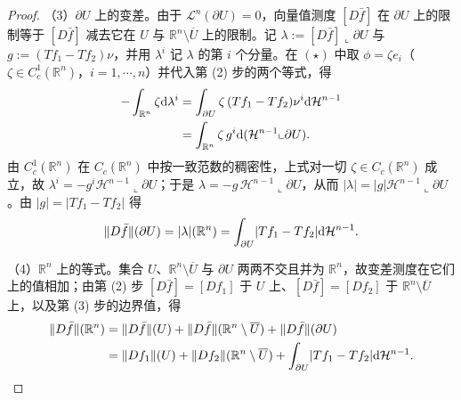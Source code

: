 \documentclass[../../main.tex]{subfiles}%
\begin{document}
\begin{proof}
（3）$\partial U$ 上的变差。由于 $\mathcal{L}^n(\partial U)=0$，向量值测度 $[D\bar f]$ 在 $\partial U$ 上的限制等于 $[D\bar f]$ 减去它在 $U$ 与 $\mathbb{R}^n\setminus\overline{U}$ 上的限制。记 $\lambda:=[D\bar f]\llcorner\partial U$ 与 $g:=(Tf_1-Tf_2)\nu$，并用 $\lambda^i$ 记 $\lambda$ 的第 $i$ 个分量。在 $(\star)$ 中取 $\phi=\zeta e_i$（$\zeta\in C_c^1(\mathbb{R}^n)$，$i=1,\cdots,n$）并代入第 (2) 步的两个等式，得
\begin{align*}
-\int_{\mathbb{R}^n}\zeta\mathrm{d}\lambda^i
&=\int_{\partial U}\zeta\,(Tf_1-Tf_2)\nu^i\mathrm{d}\mathcal{H}^{n-1}\\
&=\int_{\mathbb{R}^n}\zeta\,g^i\mathrm{d}(\mathcal{H}^{n-1}\llcorner\partial U).
\end{align*}
由 $C_c^1(\mathbb{R}^n)$ 在 $C_c(\mathbb{R}^n)$ 中按一致范数的稠密性，上式对一切 $\zeta\in C_c(\mathbb{R}^n)$ 成立，故 $\lambda^i=-g^i\mathcal{H}^{n-1}\llcorner\partial U$；于是 $\lambda=-g\,\mathcal{H}^{n-1}\llcorner\partial U$，从而 $\lvert\lambda\rvert=\lvert g\rvert\mathcal{H}^{n-1}\llcorner\partial U$。由 $\lvert g\rvert=\lvert Tf_1-Tf_2\rvert$ 得
\begin{align*}
\lVert D\bar f\rVert(\partial U)=\lvert\lambda\rvert(\mathbb{R}^n)=\int_{\partial U}\lvert Tf_1-Tf_2\rvert\mathrm{d}\mathcal{H}^{n-1}.
\end{align*}

（4）$\mathbb{R}^n$ 上的等式。集合 $U$、$\mathbb{R}^n\setminus\overline{U}$ 与 $\partial U$ 两两不交且并为 $\mathbb{R}^n$，故变差测度在它们上的值相加；由第 (2) 步 $[D\bar f]=[Df_1]$ 于 $U$ 上、$[D\bar f]=[Df_2]$ 于 $\mathbb{R}^n\setminus\overline{U}$ 上，以及第 (3) 步的边界值，得
\begin{align*}
\lVert D\bar f\rVert(\mathbb{R}^n)&=\lVert D\bar f\rVert(U)+\lVert D\bar f\rVert(\mathbb{R}^n\setminus\overline{U})+\lVert D\bar f\rVert(\partial U)\\
&=\lVert Df_1\rVert(U)+\lVert Df_2\rVert(\mathbb{R}^n\setminus\overline{U})+\int_{\partial U}\lvert Tf_1-Tf_2\rvert\mathrm{d}\mathcal{H}^{n-1}.
\end{align*}
\end{proof}
\end{document}
